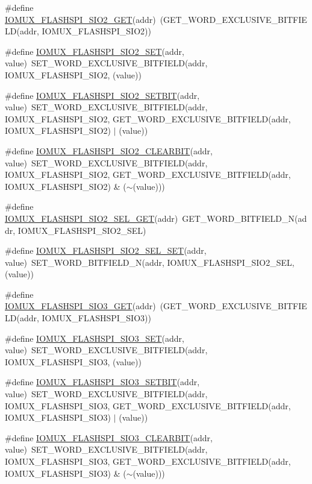 \begin{DoxyCompactItemize}
\item 
\#define \hyperlink{a00559_a6523ad18b96221a8b76698ab8ae175b1}{IOMUX\_\-FLASHSPI\_\-SIO2\_\-GET}(addr)~(GET\_\-WORD\_\-EXCLUSIVE\_\-BITFIELD(addr, IOMUX\_\-FLASHSPI\_\-SIO2))
\item 
\#define \hyperlink{a00559_a8106b0cc345ee008b6c7362f9d74e161}{IOMUX\_\-FLASHSPI\_\-SIO2\_\-SET}(addr, value)~SET\_\-WORD\_\-EXCLUSIVE\_\-BITFIELD(addr, IOMUX\_\-FLASHSPI\_\-SIO2, (value))
\item 
\#define \hyperlink{a00559_a703c1a75dbc0a41fdce3021ee912bdff}{IOMUX\_\-FLASHSPI\_\-SIO2\_\-SETBIT}(addr, value)~SET\_\-WORD\_\-EXCLUSIVE\_\-BITFIELD(addr, IOMUX\_\-FLASHSPI\_\-SIO2, GET\_\-WORD\_\-EXCLUSIVE\_\-BITFIELD(addr, IOMUX\_\-FLASHSPI\_\-SIO2) $|$ (value))
\item 
\#define \hyperlink{a00559_ae2d5a8b85b9d1e5b44ca1961068ee52f}{IOMUX\_\-FLASHSPI\_\-SIO2\_\-CLEARBIT}(addr, value)~SET\_\-WORD\_\-EXCLUSIVE\_\-BITFIELD(addr, IOMUX\_\-FLASHSPI\_\-SIO2, GET\_\-WORD\_\-EXCLUSIVE\_\-BITFIELD(addr, IOMUX\_\-FLASHSPI\_\-SIO2) \& ($\sim$(value)))
\item 
\#define \hyperlink{a00559_a764373acc866319c6b1f8f55dd204976}{IOMUX\_\-FLASHSPI\_\-SIO2\_\-SEL\_\-GET}(addr)~GET\_\-WORD\_\-BITFIELD\_\-N(addr, IOMUX\_\-FLASHSPI\_\-SIO2\_\-SEL)
\item 
\#define \hyperlink{a00559_ad72bdfd63893801014c56a9c0f678dab}{IOMUX\_\-FLASHSPI\_\-SIO2\_\-SEL\_\-SET}(addr, value)~SET\_\-WORD\_\-BITFIELD\_\-N(addr, IOMUX\_\-FLASHSPI\_\-SIO2\_\-SEL, (value))
\item 
\#define \hyperlink{a00559_af4092c6775bfe34a314d62c5f8c4e0f5}{IOMUX\_\-FLASHSPI\_\-SIO3\_\-GET}(addr)~(GET\_\-WORD\_\-EXCLUSIVE\_\-BITFIELD(addr, IOMUX\_\-FLASHSPI\_\-SIO3))
\item 
\#define \hyperlink{a00559_ae8258ad293261b93ff365bd232a7cb0f}{IOMUX\_\-FLASHSPI\_\-SIO3\_\-SET}(addr, value)~SET\_\-WORD\_\-EXCLUSIVE\_\-BITFIELD(addr, IOMUX\_\-FLASHSPI\_\-SIO3, (value))
\item 
\#define \hyperlink{a00559_acb63cbe676267a1942b732881d31a891}{IOMUX\_\-FLASHSPI\_\-SIO3\_\-SETBIT}(addr, value)~SET\_\-WORD\_\-EXCLUSIVE\_\-BITFIELD(addr, IOMUX\_\-FLASHSPI\_\-SIO3, GET\_\-WORD\_\-EXCLUSIVE\_\-BITFIELD(addr, IOMUX\_\-FLASHSPI\_\-SIO3) $|$ (value))
\item 
\#define \hyperlink{a00559_af45cfb2561d4d024d18f78562ebc82e6}{IOMUX\_\-FLASHSPI\_\-SIO3\_\-CLEARBIT}(addr, value)~SET\_\-WORD\_\-EXCLUSIVE\_\-BITFIELD(addr, IOMUX\_\-FLASHSPI\_\-SIO3, GET\_\-WORD\_\-EXCLUSIVE\_\-BITFIELD(addr, IOMUX\_\-FLASHSPI\_\-SIO3) \& ($\sim$(value)))

\end{DoxyCompactItemize}
